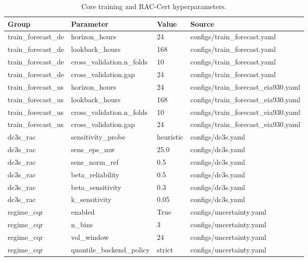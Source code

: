 \begin{table}[htbp]
\centering
\small
\caption{Core training and RAC-Cert hyperparameters.}
\label{tab:TBL06_HYPERPARAMS}
\setlength{\tabcolsep}{4pt}
\renewcommand{\arraystretch}{1.0}
\begin{tabular}{llll}
\toprule
Group & Parameter & Value & Source \\
\midrule
train\_forecast\_de & horizon\_hours & 24 & configs/train\_forecast.yaml \\
train\_forecast\_de & lookback\_hours & 168 & configs/train\_forecast.yaml \\
train\_forecast\_de & cross\_validation.n\_folds & 10 & configs/train\_forecast.yaml \\
train\_forecast\_de & cross\_validation.gap & 24 & configs/train\_forecast.yaml \\
\midrule
train\_forecast\_us & horizon\_hours & 24 & configs/train\_forecast\_eia930.yaml \\
train\_forecast\_us & lookback\_hours & 168 & configs/train\_forecast\_eia930.yaml \\
train\_forecast\_us & cross\_validation.n\_folds & 10 & configs/train\_forecast\_eia930.yaml \\
train\_forecast\_us & cross\_validation.gap & 24 & configs/train\_forecast\_eia930.yaml \\
\midrule
dc3s\_rac & sensitivity\_probe & heuristic & configs/dc3s.yaml \\
dc3s\_rac & sens\_eps\_mw & 25.0 & configs/dc3s.yaml \\
dc3s\_rac & sens\_norm\_ref & 0.5 & configs/dc3s.yaml \\
dc3s\_rac & beta\_reliability & 0.5 & configs/dc3s.yaml \\
dc3s\_rac & beta\_sensitivity & 0.3 & configs/dc3s.yaml \\
dc3s\_rac & k\_sensitivity & 0.05 & configs/dc3s.yaml \\
\midrule
regime\_cqr & enabled & True & configs/uncertainty.yaml \\
regime\_cqr & n\_bins & 3 & configs/uncertainty.yaml \\
regime\_cqr & vol\_window & 24 & configs/uncertainty.yaml \\
regime\_cqr & quantile\_backend\_policy & strict & configs/uncertainty.yaml \\
\bottomrule
\end{tabular}
\end{table}